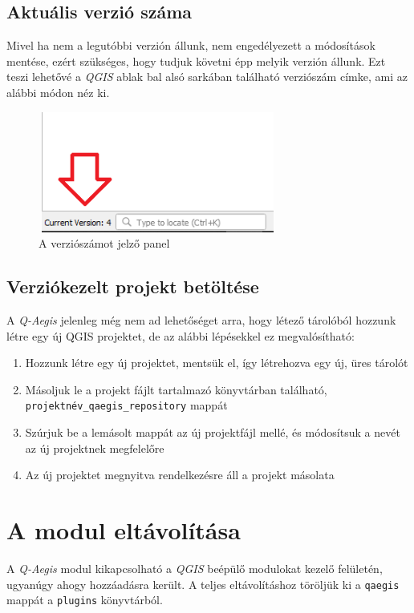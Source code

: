 \subsection{Aktuális verzió száma}
Mivel ha nem a legutóbbi verzión állunk, nem engedélyezett a módosítások mentése, ezért szükséges, hogy tudjuk követni épp melyik verzión állunk. Ezt teszi lehetővé a \emph{QGIS} ablak bal alsó sarkában található verziószám címke, ami az alábbi módon néz ki.
\begin{figure}[H]
	\centering
	\includegraphics[width=0.7\textwidth,height=150px,frame]{images/version_display.png}
	\caption{A verziószámot jelző panel}
	\label{fig:picture-6}
\end{figure}


\subsection{Verziókezelt projekt betöltése}
A \emph{Q-Aegis} jelenleg még nem ad lehetőséget arra, hogy létező tárolóból hozzunk létre egy új QGIS projektet, de az alábbi lépésekkel ez megvalósítható:
\begin{enumerate}
	\item Hozzunk létre egy új projektet, mentsük el, így létrehozva egy új, üres tárolót
	\item Másoljuk le a projekt fájlt tartalmazó könyvtárban található, \texttt{projektnév\_qaegis\_repository} mappát
	\item Szúrjuk be a lemásolt mappát az új projektfájl mellé, és módosítsuk a nevét az új projektnek megfelelőre
	\item Az új projektet megnyitva rendelkezésre áll a projekt másolata
\end{enumerate}
	
\section{A modul eltávolítása}
A \emph{Q-Aegis} modul kikapcsolható a \emph{QGIS} beépülő modulokat kezelő felületén, ugyanúgy ahogy hozzáadásra került. A teljes eltávolításhoz töröljük ki a \texttt{qaegis} mappát a \texttt{plugins} könyvtárból.
	
